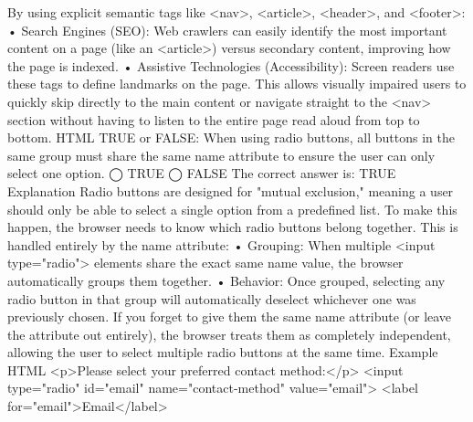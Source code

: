 By using explicit semantic tags like <nav>, <article>, <header>, and <footer>:
•	Search Engines (SEO): Web crawlers can easily identify the most important content on a page (like an <article>) versus secondary content, improving how the page is indexed.
•	Assistive Technologies (Accessibility): Screen readers use these tags to define landmarks on the page. This allows visually impaired users to quickly skip directly to the main content or navigate straight to the <nav> section without having to listen to the entire page read aloud from top to bottom.
HTML
TRUE or FALSE: When using radio buttons, all buttons in the same group must share the same name attribute to ensure the user can only select one option.
◯ TRUE
◯ FALSE
The correct answer is:
TRUE
Explanation
Radio buttons are designed for "mutual exclusion," meaning a user should only be able to select a single option from a predefined list.
To make this happen, the browser needs to know which radio buttons belong together. This is handled entirely by the name attribute:
•	Grouping: When multiple <input type="radio"> elements share the exact same name value, the browser automatically groups them together.
•	Behavior: Once grouped, selecting any radio button in that group will automatically deselect whichever one was previously chosen.
If you forget to give them the same name attribute (or leave the attribute out entirely), the browser treats them as completely independent, allowing the user to select multiple radio buttons at the same time.
Example
HTML
<p>Please select your preferred contact method:</p>
<input type="radio" id="email" name="contact-method" value="email">
<label for="email">Email</label>

